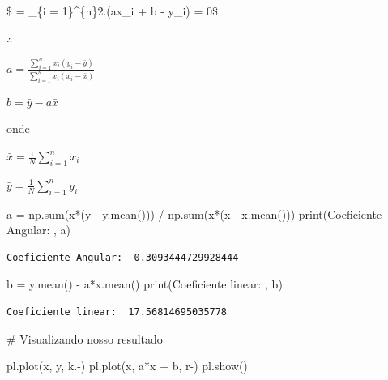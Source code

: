 \documentclass[
  letterpaper,
  DIV=11,
  numbers=noendperiod]{scrreprt}
\newenvironment{Shaded}{\begin{snugshade}}{\end{snugshade}}
\newcommand{\BuiltInTok}[1]{\textcolor[rgb]{0.00,0.23,0.31}{#1}}
\newcommand{\CommentTok}[1]{\textcolor[rgb]{0.37,0.37,0.37}{#1}}
\newcommand{\NormalTok}[1]{\textcolor[rgb]{0.00,0.23,0.31}{#1}}
\newcommand{\OperatorTok}[1]{\textcolor[rgb]{0.37,0.37,0.37}{#1}}
\newcommand{\StringTok}[1]{\textcolor[rgb]{0.13,0.47,0.30}{#1}}
\begin{document}
\$  = \sum\_\{i = 1\}\^{}\{n\}2.(ax\_i + b
- y\_i) = 0\$

\(\therefore\)

\(a = \frac{\sum_{i = 1}^{n} x_i (y_i - \bar{y})}{\sum_{i = 1}^{n} x_i (x_i - \bar{x})}\)

\(b = \bar{y} - a\bar{x}\)

onde

\(\bar{x} = \frac{1}{N}\sum_{i = 1}^{n} x_i\)

\(\bar{y} = \frac{1}{N}\sum_{i = 1}^{n} y_i\)

\begin{Shaded}
\begin{Highlighting}[]
\NormalTok{a }\OperatorTok{=}\NormalTok{ np.}\BuiltInTok{sum}\NormalTok{(x}\OperatorTok{*}\NormalTok{(y }\OperatorTok{{-}}\NormalTok{ y.mean())) }\OperatorTok{/}\NormalTok{ np.}\BuiltInTok{sum}\NormalTok{(x}\OperatorTok{*}\NormalTok{(x }\OperatorTok{{-}}\NormalTok{ x.mean()))}
\BuiltInTok{print}\NormalTok{(}\StringTok{\textquotesingle{}Coeficiente Angular: \textquotesingle{}}\NormalTok{, a)}
\end{Highlighting}
\end{Shaded}

\begin{verbatim}
Coeficiente Angular:  0.3093444729928444
\end{verbatim}

\begin{Shaded}
\begin{Highlighting}[]
\NormalTok{b }\OperatorTok{=}\NormalTok{ y.mean() }\OperatorTok{{-}}\NormalTok{ a}\OperatorTok{*}\NormalTok{x.mean()}
\BuiltInTok{print}\NormalTok{(}\StringTok{\textquotesingle{}Coeficiente linear: \textquotesingle{}}\NormalTok{, b)}
\end{Highlighting}
\end{Shaded}

\begin{verbatim}
Coeficiente linear:  17.56814695035778
\end{verbatim}

\begin{Shaded}
\begin{Highlighting}[]
\CommentTok{\# Visualizando nosso resultado}

\NormalTok{pl.plot(x, y, }\StringTok{\textquotesingle{}k.{-}\textquotesingle{}}\NormalTok{)}
\NormalTok{pl.plot(x, a}\OperatorTok{*}\NormalTok{x }\OperatorTok{+}\NormalTok{ b, }\StringTok{\textquotesingle{}r{-}\textquotesingle{}}\NormalTok{)}
\NormalTok{pl.show()}
\end{Highlighting}
\end{Shaded}
\end{document}
